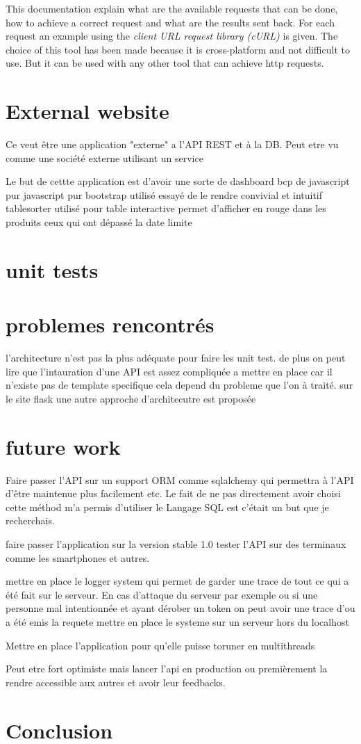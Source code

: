 This documentation explain what are the available requests that can be done, how to achieve a correct request and what are the results sent back.
For each request an example using the \textit{client URL request library (cURL)} is given. The choice of this tool has been made because  it is cross-platform and not difficult to use. But it can be used with any other tool that can achieve http requests.

\section{External website}
Ce veut être une application "externe" a l'API REST et à la DB. Peut etre vu comme une société externe utilisant un service

Le but de cettte application est d'avoir une sorte de dashboard
bcp de javascript pur
javascript pur
bootstrap utilisé
essayé de le rendre convivial et intuitif
tablesorter utilisé pour table interactive 
permet d'afficher en rouge dans les produits ceux qui ont dépassé la date limite

\section{unit tests}

\section{problemes rencontrés}
l'architecture n'est pas la plus adéquate pour faire les unit test. de plus on peut lire que l'intauration d'une API est assez compliquée a mettre en place car il n'existe pas de template specifique cela depend du probleme que l'on à traité. sur le site flask une autre approche d'architecutre est proposée 
\section{future work}
Faire passer l'API sur un support ORM comme sqlalchemy qui permettra à l'API d'être maintenue plus facilement etc. Le fait de ne pas directement avoir choisi cette méthod m'a permis d'utiliser le Langage SQL est c'était un but que je recherchais.

faire passer l'application sur la version stable 1.0
tester l'API sur des terminaux comme les smartphones et autres.

mettre en place le logger system qui permet de garder une trace de tout ce qui a été fait sur le serveur. En cas d'attaque du serveur par exemple ou si une personne mal intentionnée et ayant dérober un token on peut avoir une trace d'ou a été emis la requete
mettre en place le systeme sur un serveur hors du localhost

Mettre en place l'application pour qu'elle puisse toruner en multithreads


Peut etre fort optimiste mais lancer l'api en production ou premièrement la rendre accessible aux autres et avoir leur feedbacks.
\section{Conclusion}
